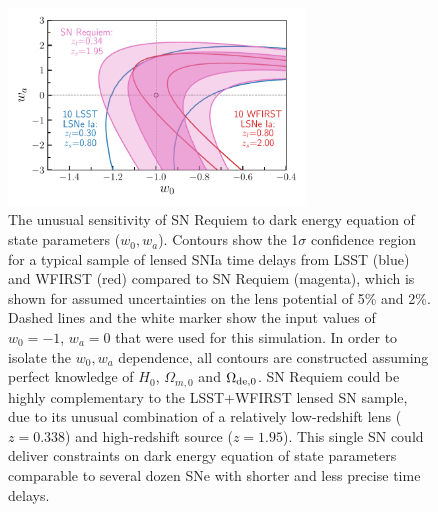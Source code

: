 \documentclass[fleqn,10pt]{wlscirep}
\begin{document}
\begin{figure}
    \centering
    \includegraphics[width=0.7\textwidth]{../Figures/snrequiem_w0wa_compared_to_lsst_wfirst.pdf}
    \caption{The unusual sensitivity of SN Requiem to dark energy equation of state parameters ($w_0, w_a$). Contours show the 1$\sigma$ confidence region for a typical sample of lensed SNIa time delays from LSST (blue) and WFIRST (red) compared to SN Requiem (magenta), which is shown for assumed uncertainties on the lens potential of 5\% and 2\%. Dashed lines and the white marker show the input values of $w_0=-1$, $w_a=0$ that were used for this simulation. In order to isolate the $w_0, w_a$ dependence, all contours are constructed assuming perfect knowledge of $H_0$, $\Omega_{m,0}$ and $\Omega_{\rm de,0}$.  SN Requiem could be highly complementary to the LSST+WFIRST lensed SN sample, due to its unusual combination of a relatively low-redshift lens ($z=0.338$) and high-redshift source ($z=1.95$). This single SN could deliver constraints on dark energy equation of state parameters comparable to several dozen SNe with shorter and less precise  time delays.}
    \label{fig:my_label}
\end{figure}



\end{document}

